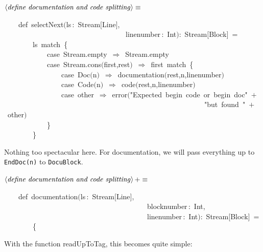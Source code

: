 \documentclass[a4paper,12pt]{article}
\begin{document}
$\left<\mbox{\emph{define documentation and code splitting}}\right>\equiv$
\begin{program}~~~~{\vem def}~selectNext$($ls\,{\rm :}~Stream$[$Line$]$,
\\~~~~~~~~~~~~~~~~~~~~~~~~~~~~~~~~~~linenumber\,{\rm :}~Int$)${\rm :}~Stream$[$Block$]$~=
\\~~~~~~~~ls~{\vem match}~{\small\{}
\\~~~~~~~~~~~~{\vem case}~Stream.empty~$\Rightarrow$~Stream.empty
\\~~~~~~~~~~~~{\vem case}~Stream.cons$($first,rest$)$~$\Rightarrow$~first~{\vem match}~{\small\{}
\\~~~~~~~~~~~~~~~~{\vem case}~Doc$($n$)$~$\Rightarrow$~documentation$($rest,n,linenumber$)$
\\~~~~~~~~~~~~~~~~{\vem case}~Code$($n$)$~$\Rightarrow$~code$($rest,n,linenumber$)$
\\~~~~~~~~~~~~~~~~{\vem case}~other~$\Rightarrow$~error$($"Expected~begin~code~or~begin~doc"~$+$
\\~~~~~~~~~~~~~~~~~~~~~~~~~~~~~~~~~~~~~~~~~~~~~~~~~~~~~~~~"but~found~"~$+$~other$)$
\\~~~~~~~~~~~~{\small\}}
\\~~~~~~~~{\small\}}
\\[0.5em]\end{program}



Nothing too spectacular here. For documentation, we will pass everything
up to \texttt{EndDoc(n)} to \texttt{DocuBlock}.

$\left<\mbox{\emph{define documentation and code splitting}}\right>+\equiv$
\begin{program}~~~~{\vem def}~documentation$($ls\,{\rm :}~Stream$[$Line$]$,
\\~~~~~~~~~~~~~~~~~~~~~~~~~~~~~~~~~~~~~~~~blocknumber\,{\rm :}~Int,
\\~~~~~~~~~~~~~~~~~~~~~~~~~~~~~~~~~~~~~~~~linenumber\,{\rm :}~Int$)${\rm :}~Stream$[$Block$]$~=
\\~~~~~~~~{\small\{}
\\[0.5em]\end{program}



With the function readUpToTag, this becomes quite simple:
\end{document}
